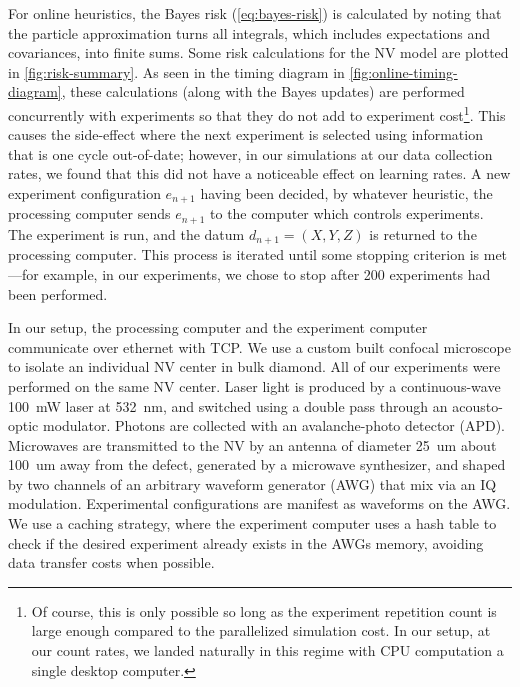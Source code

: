 \documentclass[aps,nofootinbib,twocolumn,superscriptaddress]{revtex4}
\newcommand{\eps}{e}
\newcommand{\data}{d}
\begin{document}
For online heuristics, the Bayes risk (\autoref{eq:bayes-risk})
is calculated by noting that the
particle approximation turns all integrals, which includes
expectations and covariances, into finite sums.
Some risk calculations for the NV model
are plotted in \autoref{fig:risk-summary}.
As seen in the timing diagram in \autoref{fig:online-timing-diagram}, these
calculations (along with the Bayes updates) are
performed concurrently with experiments so that they do not
add to experiment cost\footnote{Of course, this is only
possible so long as the experiment repetition count is large
enough compared to the parallelized simulation cost. In our setup, at
our count rates, we landed naturally in this regime with
CPU computation a single desktop computer.}.
This causes the side-effect where the next experiment is selected using
information that is one cycle out-of-date; however,
in our simulations at our data collection rates,
we found that this did not have a noticeable
effect on learning rates.
A new experiment configuration $\eps_{n+1}$ having been
decided, by whatever heuristic,
the processing computer sends $\eps_{n+1}$ to the
computer which controls experiments.
The experiment is run, and the datum $\data_{n+1}=(X,Y,Z)$
is returned to the processing computer.
This process is iterated until some stopping criterion is met---for
example, in our experiments, we chose to
stop after 200 experiments had been performed.

In our setup, the processing computer and the experiment
computer communicate over ethernet with TCP.
We use a custom built confocal microscope to isolate an individual
NV center in bulk diamond.
All of our experiments were performed on the same NV center.
Laser light is produced by a continuous-wave \SI{100}{mW} laser
at \SI{532}{nm}, and switched using a double pass through an
acousto-optic modulator. %
Photons are collected with an avalanche-photo detector
(APD). %
Microwaves are transmitted to the NV by an antenna of
diameter \SI{25}{um} about \SI{100}{um} away from the defect,
generated by a microwave synthesizer, and shaped by two channels of
an arbitrary waveform generator (AWG) %
that mix via an IQ modulation. %
Experimental configurations are manifest as waveforms on the AWG.
We use a caching strategy, where the experiment computer
uses a hash table to check if the desired experiment already
exists in the AWGs memory, avoiding data transfer costs when possible.
\end{document}
